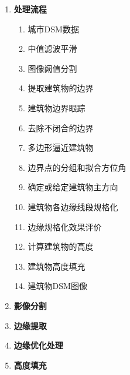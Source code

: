 \begin{enumerate}
	\item \textbf{处理流程}
		\begin{multicols}{2}
			\begin{enumerate}
				\item 城市DSM数据
				\item 中值滤波平滑
				\item 图像阙值分割
				\item 提取建筑物的边界
				\item 建筑物边界眼踪
				\item 去除不闭合的边界
				\item 多边形逼近建筑物
				\item 边界点的分组和拟合方位角
				\item 确定或给定建筑物主方向
				\item 建筑物各边缘线段规格化
				\item 边缘规格化效果评价
				\item 计算建筑物的高度
				\item 建筑物高度填充
				\item 建筑物DSM图像
			\end{enumerate}
		\end{multicols}
	\item \textbf{影像分割}
	\item \textbf{边缘提取}
	\item \textbf{边缘优化处理}
	\item \textbf{高度填充}
\end{enumerate}

